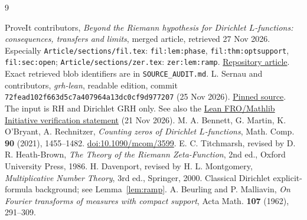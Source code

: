 \documentclass[11pt,letterpaper]{article}
\theoremstyle{remark}\newtheorem{remark}[theorem]{Remark}
\begin{document}
\begin{thebibliography}{9}
\raggedright
{} ProveIt contributors, \emph{Beyond the Riemann hypothesis for Dirichlet $L$-functions: consequences, transfers and limits}, merged article, retrieved 27 Nov 2026. Especially \texttt{Article/sections/fil.tex}: \texttt{fil:lem:phase}, \texttt{fil:thm:optsupport}, \texttt{fil:sec:open}; \texttt{Article/sections/zer.tex}: \texttt{zer:lem:ramp}. \href{https://github.com/VladimirReshetnikov/ProveIt/tree/main/Analysis/GeneralizedRiemannHypothesis/Article}{Repository article}. Exact retrieved blob identifiers are in \texttt{SOURCE\_AUDIT.md}.
 L. Sernau and contributors, \emph{grh-lean}, readable edition, commit \nolinkurl{72fead102f663d5c7a407964a13dc0cf9d977207} (25 Nov 2026). \href{https://github.com/lsernau/grh-lean/tree/72fead102f663d5c7a407964a13dc0cf9d977207}{Pinned source}. The input is RH and Dirichlet GRH only. See also the \href{https://leanprover-community.github.io/blog/posts/riemann-hypothesis/}{Lean FRO/Mathlib Initiative verification statement} (21 Nov 2026).
 M. A. Bennett, G. Martin, K. O'Bryant, A. Rechnitzer, \emph{Counting zeros of Dirichlet $L$-functions}, Math. Comp. \textbf{90} (2021), 1455--1482. \href{https://doi.org/10.1090/mcom/3599}{doi:10.1090/mcom/3599}.
 E. C. Titchmarsh, revised by D. R. Heath-Brown, \emph{The Theory of the Riemann Zeta-Function}, 2nd ed., Oxford University Press, 1986.
 H. Davenport, revised by H. L. Montgomery, \emph{Multiplicative Number Theory}, 3rd ed., Springer, 2000. Classical Dirichlet explicit-formula background; see Lemma~\ref{lem:ramp}.
 A. Beurling and P. Malliavin, \emph{On Fourier transforms of measures with compact support}, Acta Math. \textbf{107} (1962), 291--309.
\end{thebibliography}
\end{document}
